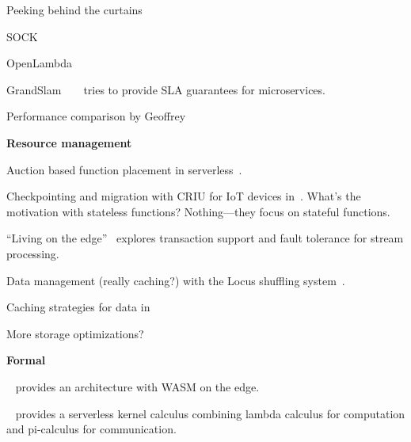 Peeking behind the curtains

SOCK~\cite{oakes_sock_2018}

OpenLambda~\cite{hendrickson2016serverless}

GrandSlam ~\cite{kannan_grandslam_2019} ~\cite{} tries to provide SLA guarantees for microservices.

Performance comparison by Geoffrey~\cite{lee_evalution_2018}


\noindent \textbf{Resource management}

Auction based function placement in serverless~\cite{bermbach_towards_2019}.

Checkpointing and migration with CRIU for IoT devices in~\cite{karhula_checkpointing_2019}. What's the motivation with stateless functions? Nothing---they focus on stateful functions.


``Living on the edge''~\cite{kulkarni_living_2019} explores transaction support and fault tolerance for stream processing. 


Data management (really caching?) with the Locus shuffling system~\cite{pu_shuffling_2019}. 


Caching strategies for data in~\cite{ghosh_caching_2019}

More storage optimizations?~\cite{zhang_narrowing_2019}

\noindent \textbf{Formal }

~\cite{hall_execution_2019} provides an architecture with WASM on the edge.

~\cite{riis_nielson_no_2019} provides a serverless kernel calculus combining lambda calculus for computation and pi-calculus for communication.





